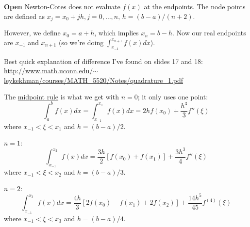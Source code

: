 \documentclass[12pt]{article}
\begin{document}
\textbf{Open} Newton-Cotes does not evaluate $f(x)$ at the endpoints. The node points are defined as $x_{j} = x_0 + jh, j = 0, \dots, n$, $h = (b-a)/(n+2)$. 

However, we define $x_{0} = a + h$, which implies $x_{n} = b - h$. Now our real endpoints are $x_{-1}$ and $x_{n+1}$ (so we're doing $\int_{x_{-1}}^{x_{n+1}} f(x)dx$).

Best quick explanation of difference I've found on slides 17 and 18:\\ \href{http://www.math.uconn.edu/~leykekhman/courses/MATH_5520/Notes/quadrature_1.pdf}{http://www.math.uconn.edu/$\sim$leykekhman/courses/MATH\_5520/Notes/quadrature\_1.pdf}

\vspace*{1 em}
The \underline{midpoint rule} is what we get with \underline{$n=0$}; it only uses one point:
\[\int_a^b f(x)dx = \int_{x_{-1}}^{x_{1}} f(x)dx = 2hf(x_0) + \frac{h^3}{3}f''(\xi)\]
where $x_{-1} < \xi < x_{1}$ and $h=(b-a)/2$.

\underline{$n=1$}:
\[ \int_{x_{-1}}^{x_{2}} f(x)dx = \frac{3h}{2}[f(x_0) + f(x_1)] + \frac{3h^3}{4}f''(\xi)\]
where $x_{-1} < \xi < x_{2}$ and $h=(b-a)/3$.

\underline{$n=2$}:
\[ \int_{x_{-1}}^{x_{3}} f(x)dx = \frac{4h}{3}[2f(x_0) - f(x_1) + 2f(x_2)] + \frac{14h^5}{45}f^{(4)}(\xi)\]
where $x_{-1} < \xi < x_{3}$ and $h=(b-a)/4$.
\end{document}
